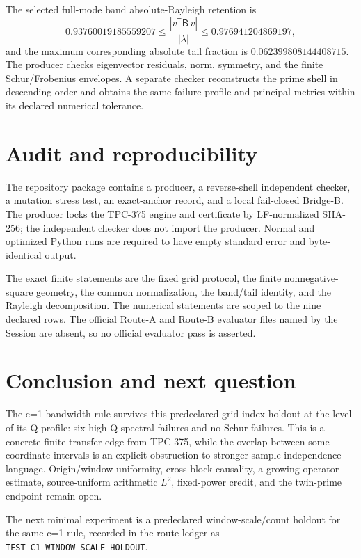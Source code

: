 \documentclass[10pt]{article}
\newcommand{\B}{\mathsf B}
\begin{document}
The selected full-mode band absolute-Rayleigh retention is
\[
 0.93760019185559207\leq
  \frac{|v^\mathsf{T}\B\,v|}{|\lambda|}
  \leq0.976941204869197,
\]
and the maximum corresponding absolute tail fraction is
$0.062399808144408715$.  The producer checks eigenvector residuals, norm,
symmetry, and the finite Schur/Frobenius envelopes.  A separate checker
reconstructs the prime shell in descending order and obtains the same
failure profile and principal metrics within its declared numerical
tolerance.

\section{Audit and reproducibility}

The repository package contains a producer, a reverse-shell independent
checker, a mutation stress test, an exact-anchor record, and a local
fail-closed Bridge-B.  The producer locks the TPC-375 engine and certificate
by LF-normalized SHA-256; the independent checker does not import the
producer.  Normal and optimized Python runs are required to have empty
standard error and byte-identical output.

The exact finite statements are the fixed grid protocol, the finite
nonnegative-square geometry, the common normalization, the band/tail
identity, and the Rayleigh decomposition.  The numerical statements are
scoped to the nine declared rows.  The official Route-A and Route-B
evaluator files named by the Session are absent, so no official evaluator
pass is asserted.

\section{Conclusion and next question}

The c=1 bandwidth rule survives this predeclared grid-index holdout at the
level of its Q-profile: six high-Q spectral failures and no Schur failures.
This is a concrete finite transfer edge from TPC-375, while the overlap
between some coordinate intervals is an explicit obstruction to stronger
sample-independence language.  Origin/window uniformity, cross-block
causality, a growing operator estimate, source-uniform arithmetic $L^2$,
fixed-power credit, and the twin-prime endpoint remain open.

The next minimal experiment is a predeclared window-scale/count holdout for
the same c=1 rule, recorded in the route ledger as
\texttt{TEST\_C1\_WINDOW\_SCALE\_HOLDOUT}.
\end{document}
